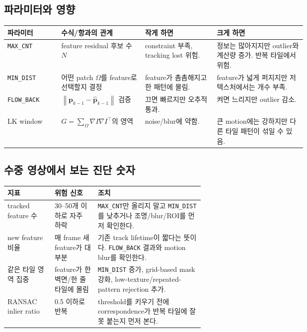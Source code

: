 \documentclass[11pt,a4paper]{article}
\newcommand{\norm}[1]{\left\lVert #1 \right\rVert}
\newcommand{\code}[1]{\texttt{#1}}
\begin{document}
\subsection*{파라미터와 영향}

\small
\begin{tabularx}{\linewidth}{p{0.18\linewidth}p{0.28\linewidth}p{0.24\linewidth}Y}
\toprule
\textbf{파라미터} & \textbf{수식/항과의 관계} & \textbf{작게 하면} & \textbf{크게 하면} \\
\midrule
\code{MAX\_CNT} & feature residual 후보 수 \(N\) & constraint 부족, tracking lost 위험. & 정보는 많아지지만 outlier와 계산량 증가. 반복 타일에서 위험. \\
\code{MIN\_DIST} & 어떤 patch \(\Omega\)를 feature로 선택할지 결정 & feature가 촘촘해지고 한 패턴에 몰림. & feature가 넓게 퍼지지만 저텍스처에서는 개수 부족. \\
\code{FLOW\_BACK} & \(\norm{\mathbf{p}_{k-1}-\hat{\mathbf{p}}_{k-1}}\) 검증 & 끄면 빠르지만 오추적 통과. & 켜면 느리지만 outlier 감소. \\
LK window & \(G=\sum_{\Omega}\nabla I\nabla I^\top\)의 영역 & noise/blur에 약함. & 큰 motion에는 강하지만 다른 타일 패턴이 섞일 수 있음. \\
\bottomrule
\end{tabularx}
\normalsize

\subsection*{수중 영상에서 보는 진단 숫자}

\begin{tabularx}{\linewidth}{p{0.24\linewidth}p{0.22\linewidth}Y}
\toprule
\textbf{지표} & \textbf{위험 신호} & \textbf{조치} \\
\midrule
tracked feature 수 & 30--50개 이하로 자주 하락 & \code{MAX\_CNT}만 올리지 말고 \code{MIN\_DIST}를 낮추거나 조명/blur/ROI를 먼저 확인한다. \\
new feature 비율 & 매 frame 새 feature가 대부분 & 기존 track lifetime이 짧다는 뜻이다. \code{FLOW\_BACK} 결과와 motion blur를 확인한다. \\
같은 타일 영역 집중 & feature가 한 벽면/한 줄 타일에 몰림 & \code{MIN\_DIST} 증가, grid-based mask 강화, low-texture/repeated-pattern rejection 추가. \\
RANSAC inlier ratio & 0.5 이하로 반복 & threshold를 키우기 전에 correspondence가 반복 타일에 잘못 붙는지 먼저 본다. \\
\bottomrule
\end{tabularx}
\end{document}
